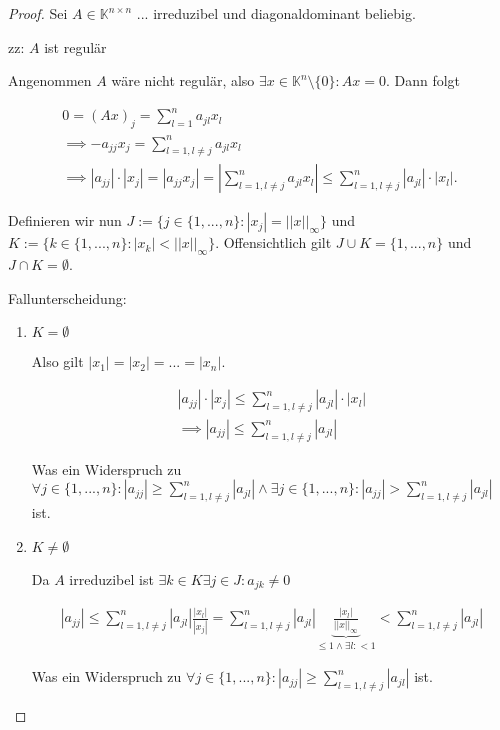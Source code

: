 \documentclass[]{article}
\newcommand{\norm}[1]{\left|\left|#1\right|\right|}
\newcommand{\norminf}[1]{\norm{#1}_\infty}
\begin{document}
\begin{proof}
	Sei $A\in\mathbb{K}^{n\times n}$ ... irreduzibel und diagonaldominant beliebig.
	
	zz: $A$ ist regulär
	
	Angenommen $A$ wäre nicht regulär, also $\exists x\in\mathbb{K}^n\setminus\{0\}: Ax=0$. Dann folgt
	
	\begin{align*}
		0 = (Ax)_j = \sum_{l=1}^{n}a_{jl}x_l\\
		\implies -a_{jj}x_j = \sum_{l=1,l\neq j}^{n}a_{jl} x_l\\
		\implies |a_{jj}|\cdot |x_j| = |a_{jj}x_j| = \left|\sum_{l=1,l\neq j}^{n}a_{jl} x_l\right| \leq \sum_{l=1,l\neq j}^{n}|a_{jl}| \cdot |x_l|.
	\end{align*}

	Definieren wir nun $J:=\{j\in\{1,...,n\}: |x_j| = \norminf{x}\}$ und $K:=\{k\in\{1,...,n\}: |x_k| < \norminf{x}\}$. Offensichtlich gilt $J \cup K = \{1, ..., n\}$ und $J \cap K = \emptyset$.

	Fallunterscheidung:
	
	\begin{enumerate}[label=\arabic*. Fall: ]
		\item $K = \emptyset$
		
		Also gilt $|x_1| = |x_2| = ... = |x_n|$.
		
		\begin{align*}
			|a_{jj}|\cdot |x_j| \leq \sum_{l=1,l\neq j}^{n}|a_{jl}| \cdot |x_l| \\
			\implies |a_{jj}| \leq \sum_{l=1,l\neq j}^{n}|a_{jl}|
		\end{align*}
	
		Was ein Widerspruch zu $\forall j \in \{1,...,n\}: |a_{jj}| \geq \sum_{l=1, l\neq j}^{n}|a_{jl}| \land \exists j\in\{1,...,n\}: |a_{jj}| > \sum_{l=1, l\neq j}^{n}|a_{jl}|$ ist.
		
		\item $K \neq \emptyset$
		
		Da $A$ irreduzibel ist $\exists k\in K \exists j \in J: a_{jk} \neq 0$
		
		\begin{align*}
			|a_{jj}| \leq \sum_{l=1,l\neq j}^{n}|a_{jl}|\frac{|x_l|}{|x_j|} = \sum_{l=1,l\neq j}^{n}|a_{jl}|\underbrace{\frac{|x_l|}{\norminf{x}}}_{\leq 1 \land \exists l: < 1} < \sum_{l=1,l\neq j}^{n}|a_{jl}|
		\end{align*}
	
		Was ein Widerspruch zu $\forall j \in \{1,...,n\}: |a_{jj}| \geq \sum_{l=1, l\neq j}^{n}|a_{jl}|$ ist.
	\end{enumerate}


\end{proof}
\end{document}
